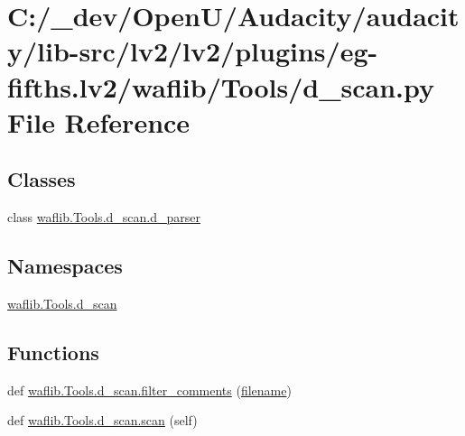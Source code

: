 \hypertarget{lv2_2plugins_2eg-fifths_8lv2_2waflib_2_tools_2d__scan_8py}{}\section{C\+:/\+\_\+dev/\+Open\+U/\+Audacity/audacity/lib-\/src/lv2/lv2/plugins/eg-\/fifths.lv2/waflib/\+Tools/d\+\_\+scan.py File Reference}
\label{lv2_2plugins_2eg-fifths_8lv2_2waflib_2_tools_2d__scan_8py}
\subsection*{Classes}
\begin{DoxyCompactItemize}
\item 
class \hyperlink{classwaflib_1_1_tools_1_1d__scan_1_1d__parser}{waflib.\+Tools.\+d\+\_\+scan.\+d\+\_\+parser}
\end{DoxyCompactItemize}
\subsection*{Namespaces}
\begin{DoxyCompactItemize}
\item 
 \hyperlink{namespacewaflib_1_1_tools_1_1d__scan}{waflib.\+Tools.\+d\+\_\+scan}
\end{DoxyCompactItemize}
\subsection*{Functions}
\begin{DoxyCompactItemize}
\item 
def \hyperlink{namespacewaflib_1_1_tools_1_1d__scan_a69a1f7647c38122c357199fd7b4444d3}{waflib.\+Tools.\+d\+\_\+scan.\+filter\+\_\+comments} (\hyperlink{test__portburn_8cpp_a7efa5e9c7494c7d4586359300221aa5d}{filename})
\item 
def \hyperlink{namespacewaflib_1_1_tools_1_1d__scan_ac5685815562961157b97476a3a3658ca}{waflib.\+Tools.\+d\+\_\+scan.\+scan} (self)
\end{DoxyCompactItemize}
